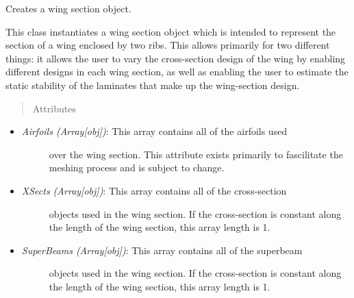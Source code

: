 \documentclass[letterpaper,10pt,english]{sphinxmanual}
\begin{document}
\begin{fulllineitems}
\label{structures:AeroComBAT.Structures.WingSection}
Creates a wing section object.

This class instantiates a wing section object which is intended to
represent the section of a wing enclosed by two ribs. This allows primarily
for two different things: it allows the user to vary the cross-section
design of the wing by enabling different designs in each wing section, as
well as enabling the user to estimate the static stability of the laminates
that make up the wing-section design.
\begin{quote}\begin{description}
\item[{Attributes}] \leavevmode
\end{description}\end{quote}
\begin{itemize}
\item {} \begin{description}
\item[{\emph{Airfoils (Array{[}obj{]})}: This array contains all of the airfoils used}] \leavevmode
over the wing section. This attribute exists primarily to fascilitate
the meshing process and is subject to change.

\end{description}

\item {} \begin{description}
\item[{\emph{XSects (Array{[}obj{]})}: This array contains all of the cross-section}] \leavevmode
objects used in the wing section. If the cross-section is constant
along the length of the wing section, this array length is 1.

\end{description}

\item {} \begin{description}
\item[{\emph{SuperBeams (Array{[}obj{]})}: This array contains all of the superbeam}] \leavevmode
objects used in the wing section. If the cross-section is constant
along the length of the wing section, this array length is 1.


\end{description}
\end{itemize}
\end{fulllineitems}
\end{document}
